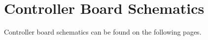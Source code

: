 \section{Controller Board Schematics}
\label{app:controller_board_schem}
Controller board schematics can be found on the following pages.

